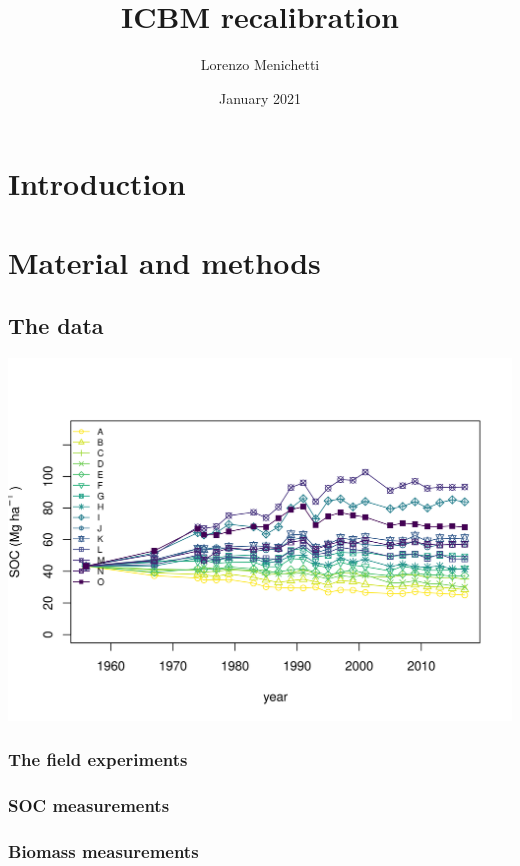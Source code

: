 \documentclass{article}
\title{ICBM recalibration}
\author{Lorenzo Menichetti}
\date{January 2021}
\begin{document}
\maketitle

\section{Introduction}

\section{Material and methods}

\subsection{The data}
\includegraphics[width=\textwidth]{Ultuna_SOC_data_used.png}

\subsubsection{The field experiments}


\subsubsection{SOC measurements}


\subsubsection{Biomass measurements}
\end{document}
